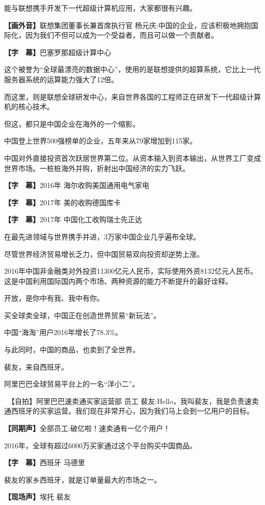 \documentclass{ctexart}
\newcommand{\zkh}[1]{\textbf{\hspace{-2.7em} 【#1】}}
\begin{document}
能与联想携手开发下一代超级计算机应用，大家都很有兴趣。

\zkh{画外音}联想集团董事长兼首席执行官 杨元庆:中国的企业，应该积极地拥抱国际化，因为我们不但可以成为一个受益者，而且可以做一个贡献者。

\zkh{字　幕}巴塞罗那超级计算中心

这个被誉为``全球最漂亮的数据中心''，使用的是联想提供的超算系统，它比上一代服务器系统的运算能力强大了12倍。

而这里，则是联想全球研发中心，来自世界各国的工程师正在研发下一代超级计算机的核心技术。

但这，都只是中国企业在海外的一个缩影。

中国登上世界500强榜单的企业，五年来从79家增加到115家。

中国对外直接投资首次跃居世界第二位。从资本输入到资本输出，从世界工厂变成世界市场。一桩桩海外并购，折射出中国经济的实力飞跃。

\zkh{字　幕}2016年 海尔收购美国通用电气家电

\zkh{字　幕}2017年 美的收购德国库卡

\zkh{字　幕}2017年 中国化工收购瑞士先正达

在最先进领域与世界携手并进，3万家中国企业几乎遍布全球。

尽管世界经济贸易增长乏力，但中国贸易双向投资却逆势上涨。

2016年中国非金融类对外投资11300亿元人民币，实际使用外资8132亿元人民币。这是中国利用国际国内两个市场、两种资源的能力不断提升的最好诠释。

开放，是你中有我、我中有你。

买全球卖全球，中国正在创造世界贸易``新玩法''。

中国``海淘''用户2016年增长了78.3{\%}。

与此同时，中国的商品，也卖到了全世界。

裴友，来自西班牙。

阿里巴巴全球贸易平台上的一名``洋小二''。

　【自拍】阿里巴巴速卖通买家运营部 员工 裴友:Hello，我叫裴友，我是负责速卖通西班牙的买家运营。我们现在非常开心，因为我们马上会到一亿用户的目标。

\zkh{同期声}全部员工:破亿啦！速卖通有一亿个用户！

2016年，全球有超过6000万买家通过这个平台购买中国商品。

\zkh{字　幕}西班牙 马德里

裴友的家乡西班牙，就是订单量最大的市场之一。

\zkh{现场声}埃托 裴友
\end{document}
